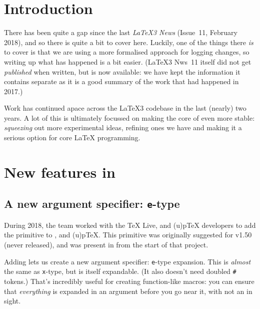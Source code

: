 \documentclass{ltnews}
\begin{document}
\maketitle

\tableofcontents

\section{Introduction}

There has been quite a gap since the last \emph{\LaTeX3 News} (Issue~11,
February 2018), and so there is quite a bit to cover here. Luckily, one of the
things there \emph{is} to cover is that we are using a more formalised approach
for logging changes, so writing up what has happened is a bit easier.
(\LaTeX3 Nws~11 itself did not get \emph{published} when written, but is
now available: we have kept the information it contains separate as it
is a good summary of the work that had happened in 2017.)

Work has continued apace across the \LaTeX3 codebase in the last (nearly) two
years. A lot of this is ultimately focussed on making the core of 
even more stable: \emph{squeezing} out more experimental ideas, refining
ones we have and making it a serious option for core \LaTeX{} programming.

\section{New features in }

\subsection{A new argument specifier: \texttt{e}-type}

During 2018, the team worked with the \TeX{} Live,  and
(u)p\TeX{} developers to add the  primitive to ,
 and (u)p\TeX{}. This primitive was originally suggested for
 v1.50 (never released), and was present in 
from the start of that project.

Adding  lets us create a new argument specifier: \texttt{e}-type
expansion. This is \emph{almost} the same as \texttt{x}-type, but is itself
expandable. (It also doesn't need doubled \verb|#| tokens.) That's incredibly
useful for creating function-like macros: you can ensure that \emph{everything}
is expanded in an argument before you go near it, with not an 
in sight.
\end{document}
